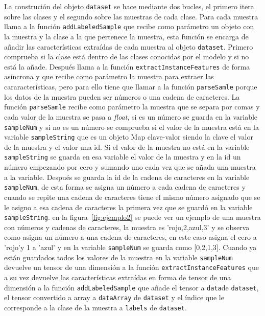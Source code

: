 \documentclass[a4paper, 12pt]{book}
\begin{document}
La construción del objeto \texttt{dataset} se hace mediante dos bucles, el primero itera sobre las clases y el segundo sobre las muestras de cada clase. Para cada muestra llama a la función \texttt{addLabeledSample} que recibe como parámetro un objeto con la muestra y la clase a la que pertenece la muestra, esta función se encarga de añadir las características extraídas de cada muestra al objeto \texttt{dataset}. Primero comprueba si la clase está dentro de las clases conocidas por el modelo y si no está la añade. Después llama a la función \texttt{extractInstanceFeatures} de forma asíncrona y que recibe como parámetro la muestra para extraer las cararacterísticas, pero para ello tiene que llamar a la función \texttt{parseSamle} porque los datos de la muestra pueden ser números o una cadena de caracteres. La función \texttt{parseSamle} recibe como parámetro la muestra que se separa por comas y cada valor de la muestra se pasa a \emph{float}, si es un número se guarda en la variable \texttt{sampleNum} y si no es un número se comprueba si el valor de la muestra está en la variable \texttt{sampleString} que es un objeto Map clave-valor siendo la clave el valor de la muestra y el valor una id. Si el valor de la muestra no está en la variable \texttt{sampleString} se guarda en esa variable el valor de la muestra y en la id un número empezando por cero y sumando uno cada vez que se añada una muestra a la variable. Después se guarda la id de la cadena de caracteres en la variable \texttt{sampleNum}, de esta forma se asigna un número a cada cadena de caracteres y cuando se repite una cadena de caracteres tiene el mismo número asignado que se le asigno a esa cadena de caracteres la primera vez que se guardó en la variable \texttt{sampleString}. en la figura~\ref{fig:ejemplo2} se puede ver un ejemplo de una muestra con números y cadenas de caracteres, la muestra es 'rojo,2,azul,3' y se observa como asigna un número a una cadena de caracteres, en este caso asigna el cero a 'rojo'y 1 a 'azul' y en la variable \texttt{sampleNum} se guarda como [0,2,1,3]. Cuando ya están guardados todos los valores de la muestra en la variable \texttt{sampleNum} devuelve un tensor de una dimensión a la función \texttt{extractInstanceFeatures} que a su vez devuelve las características extraídas en forma de tensor de una dimensión a la función \texttt{addLabeledSample} que añade el tensor a \texttt{data}de \texttt{dataset}, el tensor convertido a array a \texttt{dataArray} de \texttt{dataset} y el índice que le corresponde a la clase de la muestra a \texttt{labels} de \texttt{dataset}.
\end{document}
